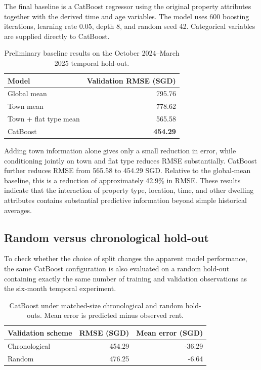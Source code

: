\documentclass[10pt]{article}
\begin{document}
The final baseline is a CatBoost regressor using the original property attributes together with the derived time and age variables.
The model uses 600 boosting iterations, learning rate 0.05, depth 8, and random seed 42.
Categorical variables are supplied directly to CatBoost.

\begin{table}[h]
\centering
\small
\begin{tabular}{lr}
\toprule
Model & Validation RMSE (SGD) \\
\midrule
Global mean & 795.76 \\
Town mean & 778.62 \\
Town + flat type mean & 565.58 \\
CatBoost & \textbf{454.29} \\
\bottomrule
\end{tabular}
\caption{Preliminary baseline results on the October 2024--March 2025 temporal hold-out.}
\label{tab:baseline-results}
\end{table}

Adding town information alone gives only a small reduction in error, while conditioning jointly on town and flat type reduces RMSE substantially.
CatBoost further reduces RMSE from 565.58 to 454.29 SGD.
Relative to the global-mean baseline, this is a reduction of approximately 42.9\% in RMSE.
These results indicate that the interaction of property type, location, time, and other dwelling attributes contains substantial predictive information beyond simple historical averages.

\subsection{Random versus chronological hold-out}

To check whether the choice of split changes the apparent model performance, the same CatBoost configuration is also evaluated on a random hold-out containing exactly the same number of training and validation observations as the six-month temporal experiment.

\begin{table}[h]
\centering
\small
\begin{tabular}{lrr}
\toprule
Validation scheme & RMSE (SGD) & Mean error (SGD) \\
\midrule
Chronological & 454.29 & -36.29 \\
Random & 476.25 & -6.64 \\
\bottomrule
\end{tabular}
\caption{CatBoost under matched-size chronological and random hold-outs. Mean error is predicted minus observed rent.}
\label{tab:random-temporal}
\end{table}
\end{document}
